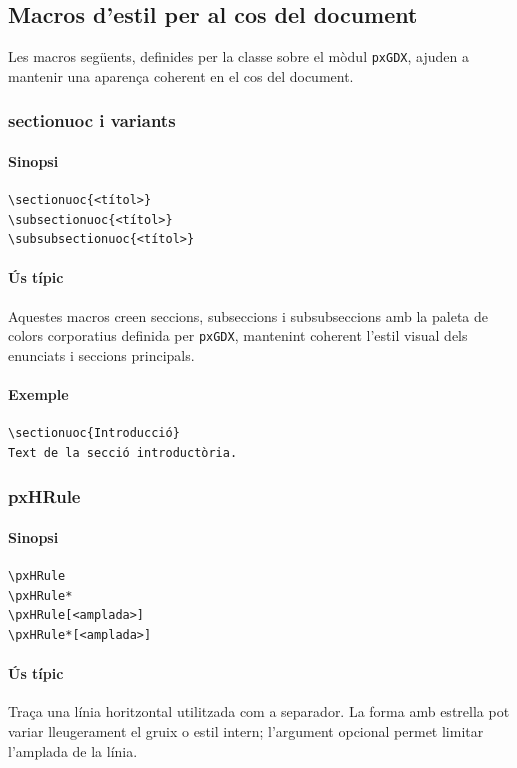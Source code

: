 \documentclass[default]{P3CTeX}
\begin{document}
\subsection{Macros d'estil per al cos del document}

Les macros següents, definides per la classe sobre el mòdul
\texttt{pxGDX}, ajuden a mantenir una aparença coherent en el cos del
document.

\subsubsection{sectionuoc i variants}

\paragraph*{Sinopsi}
\begin{verbatim}
\sectionuoc{<títol>}
\subsectionuoc{<títol>}
\subsubsectionuoc{<títol>}
\end{verbatim}

\paragraph*{Ús típic}
Aquestes macros creen seccions, subseccions i subsubseccions amb la
paleta de colors corporatius definida per \texttt{pxGDX}, mantenint
coherent l'estil visual dels enunciats i seccions principals.

\paragraph*{Exemple}
\begin{verbatim}
\sectionuoc{Introducció}
Text de la secció introductòria.
\end{verbatim}

\subsubsection{pxHRule}

\paragraph*{Sinopsi}
\begin{verbatim}
\pxHRule
\pxHRule*
\pxHRule[<amplada>]
\pxHRule*[<amplada>]
\end{verbatim}

\paragraph*{Ús típic}
Traça una línia horitzontal utilitzada com a separador. La forma amb
estrella pot variar lleugerament el gruix o estil intern; l'argument
opcional permet limitar l'amplada de la línia.
\end{document}
